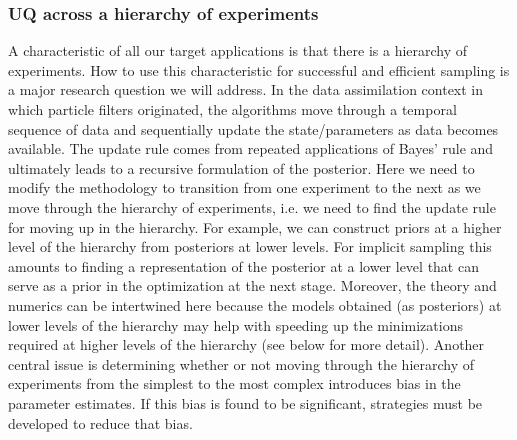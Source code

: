 \documentclass[11pt]{article}
\begin{document}
\subsubsection*{UQ across a hierarchy of experiments}
A characteristic of all our target applications is that there is a hierarchy of experiments.
How to use this characteristic for successful and efficient sampling is a major research question we will address. In the data assimilation context in which particle filters originated, the algorithms move through a temporal sequence of data and sequentially update the state/parameters as data becomes available.
The update rule comes from repeated applications of Bayes' rule and ultimately leads to a recursive formulation of the posterior.
Here we need to modify the methodology to transition from one experiment to the next as we move through the hierarchy of experiments, i.e. we need to find the update rule for moving up in the hierarchy.
For example, we can construct priors at a higher level of the hierarchy from posteriors at lower levels. For implicit sampling this amounts to finding a representation of the posterior at a lower level that can serve as a prior in the optimization at the next stage.
Moreover, the theory and numerics can be intertwined here because the models obtained (as posteriors) at lower levels of the hierarchy may help with speeding up the minimizations required at higher levels of the hierarchy (see below for more detail). 
Another central issue is determining whether or not moving through the hierarchy of experiments from the simplest to the most complex introduces bias in the parameter estimates. If this bias is found to be significant, strategies must be developed to reduce that bias. 
\end{document}
